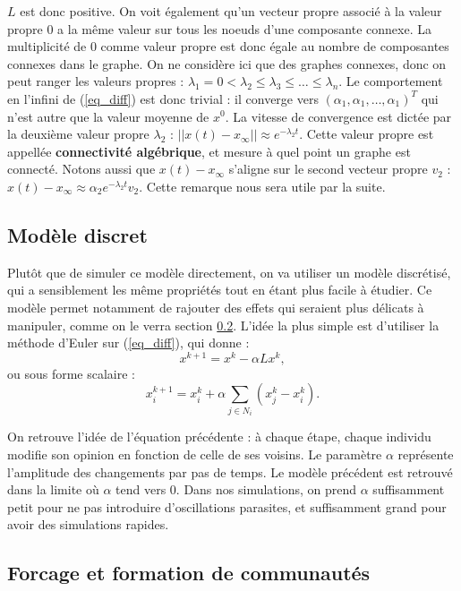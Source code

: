\documentclass[12pt]{article}
\begin{document}
$L$ est donc positive. On voit également qu'un vecteur propre associé
à la valeur propre $0$ a la même valeur sur tous les noeuds d'une
composante connexe. La multiplicité de $0$ comme valeur propre est
donc égale au nombre de composantes connexes dans le graphe. On ne
considère ici que des graphes connexes, donc on peut ranger les
valeurs propres : $\lambda_1 = 0 < \lambda_2 \leq \lambda_3 \leq \dots
\leq \lambda_n$. Le comportement en l'infini de (\ref{eq_diff}) est
donc trivial : il converge vers $(\alpha_1, \alpha_1, \dots,
\alpha_1)^T$ qui n'est autre que la valeur moyenne de $x^0$. La
vitesse de convergence est dictée par la deuxième valeur propre
$\lambda_2$ : $||x(t) - x_\infty|| \approx e^{-\lambda_2 t}$. Cette
valeur propre est appellée {\bf connectivité algébrique}, et mesure à
quel point un graphe est connecté. Notons aussi que $x(t) - x_\infty$
s'aligne sur le second vecteur propre $v_2$ : $x(t) - x_\infty \approx
\alpha_2 e^{-\lambda_2 t} v_2$. Cette remarque nous sera utile par la
suite.

\subsection{Modèle discret}
Plutôt que de simuler ce modèle directement, on va utiliser un modèle
discrétisé, qui a sensiblement les même propriétés tout en étant plus
facile à étudier. Ce modèle permet notamment de rajouter des effets
qui seraient plus délicats à manipuler, comme on le verra section
\ref{forcage}. L'idée la plus simple est d'utiliser la méthode
d'Euler sur (\ref{eq_diff}), qui donne :
\begin{equation}
  \label{eq_discrete}
  x^{k+1} = x^k - \alpha L x^k,
\end{equation}
ou sous forme scalaire :
\begin{equation}
  \label{eq_discrete_scal}
  x_i^{k+1} = x_i^k + \alpha \sum_{j \in N_i} (x_j^k - x_i^k).
\end{equation}

On retrouve l'idée de l'équation précédente : à chaque étape, chaque
individu modifie son opinion en fonction de celle de ses voisins. Le
paramètre $\alpha$ représente l'amplitude des changements par pas de
temps. Le modèle précédent est retrouvé dans la limite où $\alpha$
tend vers 0. Dans nos simulations, on prend $\alpha$ suffisamment
petit pour ne pas introduire d'oscillations parasites, et suffisamment
grand pour avoir des simulations rapides.

\subsection{Forcage et formation de communautés}
\label{forcage}
\end{document}
